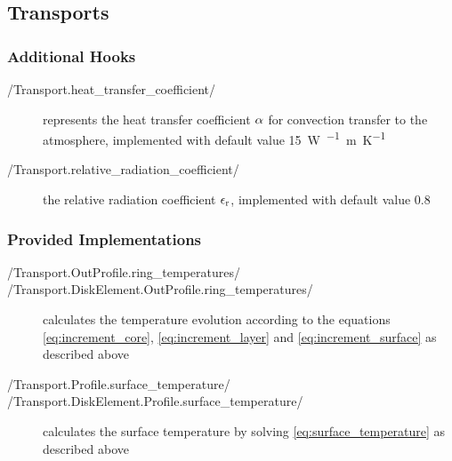 \documentclass{PyRollDocs}
\begin{document}
    \subsection{Transports}

    \subsubsection{Additional Hooks}

    \begin{description}
        \item[\py/Transport.heat_transfer_coefficient/] represents the heat transfer coefficient ${\alpha}$ for convection transfer to the atmosphere, implemented with default value \qty{15}{\watt\per\squared\meter\per\kelvin}
        \item[\py/Transport.relative_radiation_coefficient/] the relative radiation coefficient ${\epsilon_\mathrm{r}}$, implemented with default value \num{0.8}
    \end{description}

    \subsubsection{Provided Implementations}

    \begin{description}
        \item[\py/Transport.OutProfile.ring_temperatures/]
        \item[\py/Transport.DiskElement.OutProfile.ring_temperatures/] calculates the temperature evolution according to the equations \autoref{eq:increment_core}, \autoref{eq:increment_layer} and \autoref{eq:increment_surface} as described above
        \item[\py/Transport.Profile.surface_temperature/]
        \item[\py/Transport.DiskElement.Profile.surface_temperature/] calculates the surface temperature by solving \autoref{eq:surface_temperature} as described above
    \end{description}

%    

    \printbibliography
\end{document}
